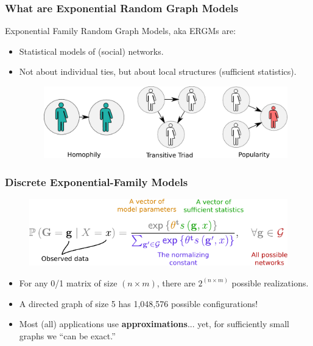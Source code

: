 \documentclass[aspectratio=169, 9pt, handout]{beamer}
\begin{document}
\begin{frame}
\frametitle{What are Exponential Random Graph Models}

Exponential Family Random Graph Models, aka \alert{ERGMs} are:\pause

\begin{itemize}
\item Statistical models of (social) networks.\pause
\item Not about individual ties, but about local structures (sufficient statistics).\pause
\begin{figure}
\includegraphics[width=.6\linewidth]{friendly-terms.pdf}
\end{figure}
\end{itemize}

\end{frame}

\begin{frame}[t,label=discrete-exponential]
	
	\frametitle{Discrete Exponential-Family Models}
	
	\begin{figure}
		\includegraphics[width=.7\linewidth]{parts-of-ergm.pdf}
	\end{figure}\pause
	
	\vfill
		
	\begin{itemize}
		\item For any 0/1 matrix of size $(n\times m)$, there are $2^{(n\times m)}$ possible realizations.\pause
		\item A directed graph of size 5 has 1,048,576 possible configurations!\pause
		\item Most (all) applications use \textbf{approximations}...\pause{} yet, for sufficiently small graphs we ``can be exact.''
	\end{itemize}
	
	\vfill\hfill\hyperlink{discrete-exponential-theory}{} %
	\hyperlink{ergm-terms}{}
	
\end{frame}
\end{document}
